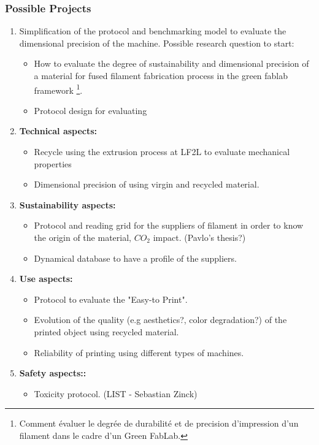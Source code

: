 \subsubsection*{Possible Projects}

\begin{enumerate}[noitemsep]
	\item Simplification of the protocol and benchmarking model to evaluate the dimensional precision of the machine. Possible research question to start:
	
	\begin{itemize}
		\item How to evaluate the degree of sustainability and dimensional precision of a material for fused filament fabrication process in the green fablab framework \footnote{Comment évaluer le degrée de durabilité et de precision d’impression d’un filament dans le cadre d’un Green FabLab.}.
		\item Protocol design for evaluating 
	\end{itemize}
	
	\item \textbf{Technical aspects:}
	
	\begin{itemize}
		\item Recycle using the extrusion process at LF2L to evaluate mechanical properties
		\item Dimensional precision of using virgin and recycled material.
	\end{itemize}
	
	\item \textbf{Sustainability aspects:}
	
	\begin{itemize}
		\item Protocol and reading grid for the suppliers of filament in order to know the origin of the material, $CO_{2}$ impact. (Pavlo's thesis?)
		\item Dynamical database to have a profile of the suppliers.
	\end{itemize}
	
	\item \textbf{Use aspects:}
	
	\begin{itemize}
		\item Protocol to evaluate the "Easy-to Print".
		\item Evolution of the quality (e.g aesthetics?, color degradation?) of the printed object using recycled material.
		\item Reliability of printing using different types of machines.
	\end{itemize}
	
	\item \textbf{Safety aspects::}
	
	\begin{itemize}
		\item Toxicity protocol. (LIST - Sebastian Zinck)
		
	\end{itemize}
	
\end{enumerate}

%
